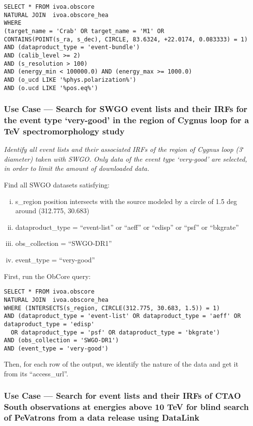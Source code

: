 \begin{verbatim}
SELECT * FROM ivoa.obscore
NATURAL JOIN  ivoa.obscore_hea
WHERE
(target_name = 'Crab' OR target_name = 'M1' OR
CONTAINS(POINT(s_ra, s_dec), CIRCLE, 83.6324, +22.0174, 0.083333) = 1)
AND (dataproduct_type = 'event-bundle')
AND (calib_level >= 2)
AND (s_resolution > 100)
AND (energy_min < 100000.0) AND (energy_max >= 1000.0)
AND (o_ucd LIKE '%phys.polarization%')
AND (o.ucd LIKE '%pos.eq%')
\end{verbatim}

\subsubsection{Use Case ---  Search for SWGO event lists and their \glspl{IRF} for the event type `very-good' in the region of Cygnus loop for a TeV spectromorphology study}

{\em Identify all event lists and their associated \glspl{IRF} of the region of Cygnus loop (3$^{\circ}$ diameter) taken with SWGO. Only data of the event type `very-good' are selected, in order to limit the amount of downloaded data.\/}

\medskip
\noindent Find all SWGO datasets satisfying:
\begin{enumerate}[(i)]
  \item s\_region position intersects with the source modeled by a circle of 1.5 deg around (312.775, 30.683)
  \item dataproduct\_type = ``event-list'' or ``aeff'' or ``edisp'' or ``psf'' or ``bkgrate''
  \item obs\_collection = ``SWGO-DR1''
  \item event\_type = ``very-good''
\end{enumerate}

First, run the ObCore query:
\begin{verbatim}
SELECT * FROM ivoa.obscore
NATURAL JOIN  ivoa.obscore_hea
WHERE (INTERSECTS(s_region, CIRCLE(312.775, 30.683, 1.5)) = 1)
AND (dataproduct_type = 'event-list' OR dataproduct_type = 'aeff' OR dataproduct_type = 'edisp'
  OR dataproduct_type = 'psf' OR dataproduct_type = 'bkgrate')
AND (obs_collection = 'SWGO-DR1')
AND (event_type = 'very-good')
\end{verbatim}

Then, for each row of the output, we identify the nature of the data and get it from its ``access\_url''.

\subsubsection{Use Case --- Search for event lists and their \glspl{IRF} of CTAO South observations at energies above 10 TeV for blind search of PeVatrons from a data release using DataLink}

